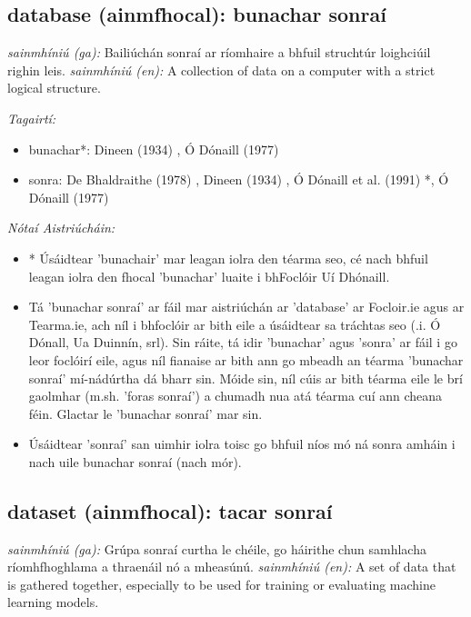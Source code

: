 \documentclass{article}
\begin{document}
\subsection*{database (ainmfhocal): bunachar sonraí} 
 \noindent \textit{sainmhíniú (ga):} Bailiúchán sonraí ar ríomhaire a bhfuil struchtúr loighciúil righin leis.
\newline\newline
 \noindent \textit{sainmhíniú (en):} A collection of data on a computer with a strict logical structure.
\newline

 \noindent \textit{Tagairtí:}
\begin{itemize}
	\item bunachar*: Dineen (1934) \cite{dineen}, Ó Dónaill (1977) \cite{odonaill}
	\item sonra: De Bhaldraithe (1978) \cite{de-bhaldraithe}, Dineen (1934) \cite{dineen}, Ó Dónaill et al. (1991) \cite{focloir-beag}*, Ó Dónaill (1977) \cite{odonaill}
\end{itemize}

 \noindent \textit{Nótaí Aistriúcháin:}
\begin{itemize}
	\item * Úsáidtear 'bunachair' mar leagan iolra den téarma seo, cé nach bhfuil leagan iolra den fhocal 'bunachar' luaite i bhFoclóir Uí Dhónaill.
	\item Tá 'bunachar sonraí' ar fáil mar aistriúchán ar 'database' ar Focloir.ie agus ar Tearma.ie, ach níl i bhfoclóir ar bith eile a úsáidtear sa tráchtas seo (.i. Ó Dónall, Ua Duinnín, srl). Sin ráite, tá idir 'bunachar' agus 'sonra' ar fáil i go leor foclóirí eile, agus níl fianaise ar bith ann go mbeadh an téarma 'bunachar sonraí' mí-nádúrtha dá bharr sin. Móide sin, níl cúis ar bith téarma eile le brí gaolmhar (m.sh. 'foras sonraí') a chumadh nua atá téarma cuí ann cheana féin. Glactar le 'bunachar sonraí' mar sin.
	\item Úsáidtear 'sonraí' san uimhir iolra toisc go bhfuil níos mó ná sonra amháin i nach uile bunachar sonraí (nach mór).
\end{itemize}


\subsection*{dataset (ainmfhocal): tacar sonraí} 
 \noindent \textit{sainmhíniú (ga):} Grúpa sonraí curtha le chéile, go háirithe chun samhlacha ríomhfhoghlama a thraenáil nó a mheasúnú.
\newline\newline
 \noindent \textit{sainmhíniú (en):} A set of data that is gathered together, especially to be used for training or evaluating machine learning models.
\newline
\end{document}

